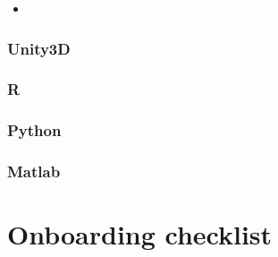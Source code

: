 \documentclass[
  12pt,
]{book}
\providecommand{\tightlist}{%
  \setlength{\itemsep}{0pt}\setlength{\parskip}{0pt}}
\begin{document}
\begin{itemize}
\tightlist
\item
\end{itemize}

\hypertarget{unity3d}{%
\subsection{Unity3D}\label{unity3d}}

\hypertarget{r}{%
\subsection{R}\label{r}}

\hypertarget{python}{%
\subsection{Python}\label{python}}

\hypertarget{matlab}{%
\subsection{Matlab}\label{matlab}}

\hypertarget{onboarding}{%
\chapter{Onboarding checklist}\label{onboarding}}

  
\end{document}
